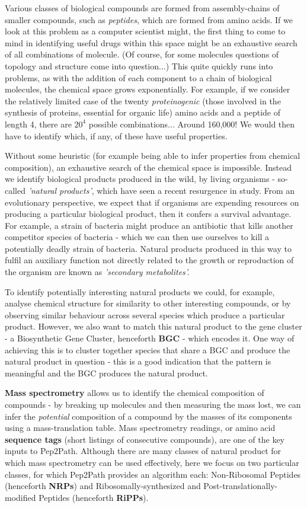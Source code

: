 \documentclass{l4proj}
\newcommand{\cit}[1]{\citep{#1}}
\begin{document}
Various classes of biological compounds are formed from assembly-chains of smaller compounds, such as \textit{peptides}, which are formed from amino acids.
If we look at this problem as a computer scientist might, the first thing to come to mind in identifying useful drugs within this space might be an exhaustive search of all combinations of molecule.
(Of course, for some molecules questions of topology and structure come into question...)
This quite quickly runs into problems, as with the addition of each component to a chain of biological molecules, the chemical space grows exponentially.
For example, if we consider the relatively limited case of the twenty \textit{proteinogenic} (those involved in the synthesis of proteins, essential for organic life) amino acids and a peptide of length 4, there are \(20^4\) possible combinations... Around 160,000! We would then have to identify which, if any, of these have useful properties.

Without some heuristic (for example being able to infer properties from chemical composition), an exhaustive search of the chemical space is impossible.
Instead we identify biological products produced in the wild, by living organisms - so-called \textit{'natural products'}, which have seen a recent resurgence in study. \cit{natural}
From an evolutionary perspective, we expect that if organisms are expending resources on producing a particular biological product, then it confers a survival advantage.
For example, a strain of bacteria might produce an antibiotic that kills another competitor species of bacteria - which we can then use ourselves to kill a potentially deadly strain of bacteria.
Natural products produced in this way to fulfil an auxiliary function not directly related to the growth or reproduction of the organism are known as \textit{'secondary metabolites'.} \cit{metabolomics}

To identify potentially interesting natural products we could, for example, analyse chemical structure for similarity to other interesting compounds, or by observing similar behaviour across several species which produce a particular product. 
However, we also want to match this natural product to the gene cluster - a Biosynthetic Gene Cluster, henceforth \textbf{BGC} - which encodes it.
One way of achieving this is to cluster together species that share a BGC and produce the natural product in question - this is a good indication that the pattern is meaningful and the BGC produces the natural product.

\textbf{Mass spectrometry} allows us to identify the chemical composition of compounds - by breaking up molecules and then measuring the mass lost, we can infer the \textit{potential} composition of a compound by the masses of its components using a mass-translation table. Mass spectrometry readings, or amino acid \textbf{sequence tags} (short listings of consecutive compounds), are one of the key inputs to Pep2Path. Although there are many classes of natural product for which mass spectrometry can be used effectively, \cit{msomics} here we focus on two particular classes, for which Pep2Path provides an algorithm each: Non-Ribosomal Peptides (henceforth \textbf{NRPs}) and Ribosomally-synthesized and Post-translationally-modified Peptides (henceforth \textbf{RiPPs}). 
\end{document}
